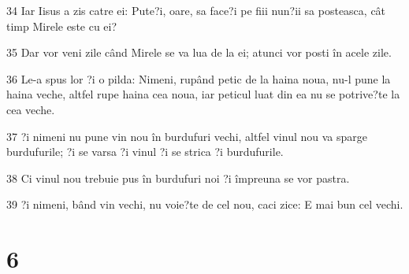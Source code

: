 \par 34 Iar Iisus a zis catre ei: Pute?i, oare, sa face?i pe fiii nun?ii sa posteasca, cât timp Mirele este cu ei?
\par 35 Dar vor veni zile când Mirele se va lua de la ei; atunci vor posti în acele zile.
\par 36 Le-a spus lor ?i o pilda: Nimeni, rupând petic de la haina noua, nu-l pune la haina veche, altfel rupe haina cea noua, iar peticul luat din ea nu se potrive?te la cea veche.
\par 37 ?i nimeni nu pune vin nou în burdufuri vechi, altfel vinul nou va sparge burdufurile; ?i se varsa ?i vinul ?i se strica ?i burdufurile.
\par 38 Ci vinul nou trebuie pus în burdufuri noi ?i împreuna se vor pastra.
\par 39 ?i nimeni, bând vin vechi, nu voie?te de cel nou, caci zice: E mai bun cel vechi.

\chapter{6}

